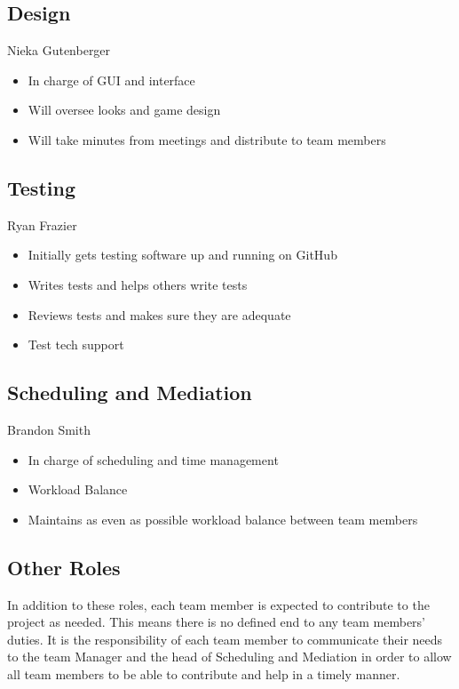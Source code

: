 \documentclass[11pt, titlepage]{article}
\begin{document}
    \subsection{Design}
		Nieka Gutenberger
		\begin{itemize}
			\item In charge of GUI and interface
    	\item Will oversee looks and game design
    	\item Will take minutes from meetings and distribute to team members
		\end{itemize}

    \subsection{Testing}
		Ryan Frazier
		\begin{itemize}
			\item Initially gets testing software up and running on GitHub
	  		\item Writes tests and helps others write tests
    		\item Reviews tests and makes sure they are adequate
    		\item Test tech support
		\end{itemize}

    \subsection{Scheduling and Mediation}
	    Brandon Smith
   		\begin{itemize}
    		\item In charge of scheduling and time management
    		\item Workload Balance
    		\item Maintains as even as possible workload balance between team members
		\end{itemize}

     \subsection{Other Roles}
   	In addition to these roles, each team member is expected to contribute to the project as needed.  This means there is no defined end to any team members' duties.  It is the responsibility of each team member to communicate their needs to the team Manager and the head of Scheduling and Mediation in order to allow all team members to be able to contribute and help in a timely manner.
\end{document}
